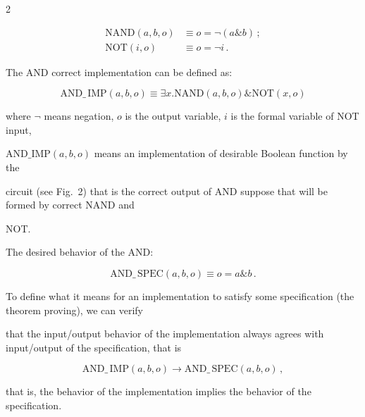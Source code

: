 \begin{multicols}{2}
\noindent


\begin{align*}


 \mathrm{NAND}(a,b,o) &\equiv o = \neg(a\&b)\,;\\


 \mathrm{NOT}(i,o) &\equiv o= \neg i\,.


\end{align*}





The AND correct implementation can be defined as:


$$


    \mathrm{AND}\_\,\mathrm{IMP}(a,b,o) \equiv \exists x. \mathrm{NAND}(a,b,o)\&\mathrm{NOT}(x,o)


$$


where $\neg$ means negation, $o$ is the output variable, $i$ is the formal variable of NOT input,


$\mathrm{AND}\_\mathrm{IMP}(a,b,o)$ means an implementation of  desirable Boolean function by the


circuit (see Fig.~2) that is the correct output of AND suppose that  will be formed by correct NAND and


NOT.





The desired behavior of the AND:





\noindent


        $$


            \mathrm{AND}\_\,\mathrm{SPEC}(a,b,o)\equiv o =a\&b\,.


$$





To define what it means for an implementation to satisfy some specification (the theorem proving), we can verify


that the input/output behavior of the imple\-men\-tation always agrees with input/output of the specification, that is





\noindent


$$


\mathrm{AND}\_\,\mathrm{IMP}(a,b,o)  \rightarrow \mathrm{AND}\_\,\mathrm{SPEC}(a,b,o)\,,


$$


that is, the behavior of the implementation implies the behavior of the specification.






\end{multicols}
